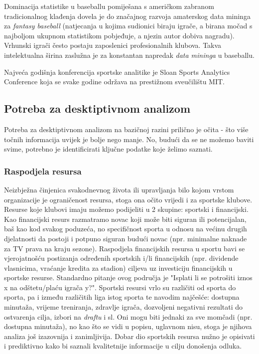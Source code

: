 \documentclass{ferseminar}
\begin{document}
Dominacija statistike u baseballu pomiješana s američkom zabranom tradicionalnog klađenja dovela je do značajnog razvoja amaterskog data mininga za \textit{fantasy baseball} (natjecanja u kojima sudionici biraju igrače, a birana močad s najboljom ukupnom statistikom pobjeđuje, a njezin autor dobiva nagradu). Vrhunski igrači često postaju zaposlenici profesionalnih klubova. Takva intelektualna širina zaslužna je za konstantan napredak \textit{data mininga} u baseballu.

Najveća godišnja konferencija sportske analitike je Sloan Sports Analytics Conference koja se svake godine održava na prestižnom sveučilištu MIT. \cite{Sloan}

\subsection{Potreba za desktiptivnom analizom}

Potreba za desktiptivnom analizom na bazičnoj razini prilično je očita - što više točnih informacija uvijek je bolje nego manje. No, budući da se ne možemo baviti svime, potrebno je identificirati ključne podatke koje želimo saznati.

\subsubsection{Raspodjela resursa}
Neizbježna činjenica svakodnevnog života ili upravljanja bilo kojom vrstom organizacije je ograničenost resursa, stoga ona očito vrijedi i za sportske klubove. Resurse koje klubovi imaju možemo podijeliti u 2 skupine: sportski i financijski. 
\newline
Kao financijski resurs razmatramo novac koji može biti siguran ili potencijalan, baš kao kod svakog poduzeća, no specifičnost sporta u odnosu na većinu drugih djelatnosti da postoji i potpuno siguran budući novac (npr. minimalne naknade za TV prava na kraju sezone). Raspodjela financijskih resursa u sportu bavi se vjerojatnošću postizanja određenih sportskih i/li financijskih (npr. dividende vlasnicima, vraćanje kredita za stadion) ciljeva uz investiciju financijskih u sportske resurse. Standardno pitanje ovog područja je "Isplati li se potrošiti 
iznos x na odštetu/plaću igrača y?".
\newline
Sportski resursi vrlo su različiti od sporta do sporta, pa i između različitih liga istog sporta te navodim najčešće: dostupna minutaža, vrijeme treniranja, zdravlje igrača, dozvoljeni negativni rezultati do ostvarenja cilja, izbori na \textit{draftu} i sl. Oni mogu biti jednaki za sve momčadi (npr. dostupna minutaža), no kao što se vidi u popisu, uglavnom nisu, stoga je njihova analiza još izazovnija i zanimljivija. Dobar dio sportskih resursa nužno je opisivati i prediktivno kako bi saznali kvalitetnije informacije u cilju donošenja odluka.
\end{document}
